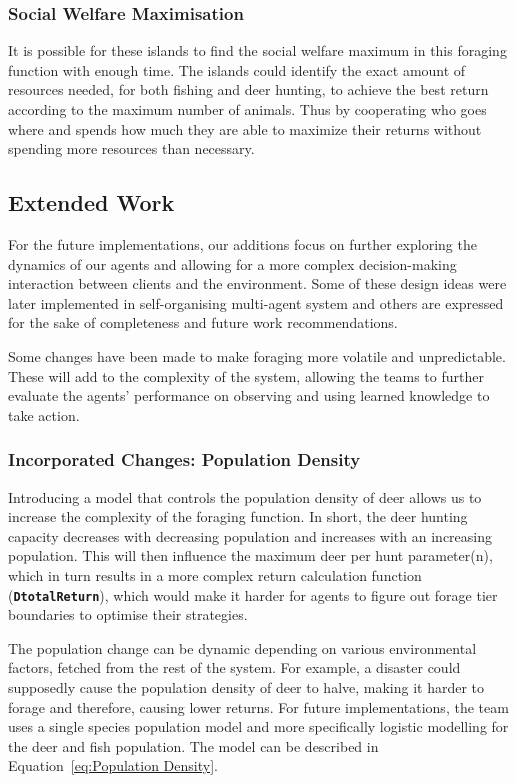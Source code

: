 \subsubsection{Social Welfare Maximisation}

It is possible for these islands to find the social welfare maximum in this foraging function with enough time. The islands could identify the exact amount of resources needed, for both fishing and deer hunting, to achieve the best return according to the maximum number of animals. Thus by cooperating who goes where and spends how much they are able to maximize their returns without spending more resources than necessary.

\subsection{Extended Work}

For the future implementations, our additions focus on further exploring the dynamics of our agents and allowing for a more complex decision-making interaction between clients and the environment. Some of these design ideas were later implemented in self-organising multi-agent system and others are expressed for the sake of completeness and future work recommendations.

Some changes have been made to make foraging more volatile and unpredictable. These will add to the complexity of the system, allowing the teams to further evaluate the agents’ performance on observing and using learned knowledge to take action.

\subsubsection{Incorporated Changes: Population Density}

Introducing a model that controls the population density of deer allows us to increase the complexity of the foraging function. In short, the deer hunting capacity decreases with decreasing population and increases with an increasing population. This will then influence the maximum deer per hunt parameter(n), which in turn results in a more complex return calculation function (\texttt{\textbf{DtotalReturn}}), which would make it harder for agents to figure out forage tier boundaries to optimise their strategies.

The population change can be dynamic depending on various environmental factors, fetched from the rest of the system. For example, a disaster could supposedly cause the population density of deer to halve, making it harder to forage and therefore, causing lower returns. For future implementations, the team uses a single species population model and more specifically logistic modelling for the deer and fish population. The model can be described in Equation~\eqref{eq:Population Density}.

